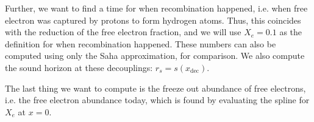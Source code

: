     Further, we want to find a time for when recombination happened, i.e. when free electron was captured by protons to form hydrogen atoms. Thus, this coincides with the reduction of the free electron fraction, and we will use $X_e=0.1$ as the definition for when recombination happened. These numbers can also be computed using only the Saha approximation, for comparison. We also compute the sound horizon at these decouplings: $r_s = s(x_\mathrm{dec})$.

    The last thing we want to compute is the freeze out abundance of free electrons, i.e. the free electron abundance today, which is found by evaluating the spline for $X_e$ at $x=0$.



